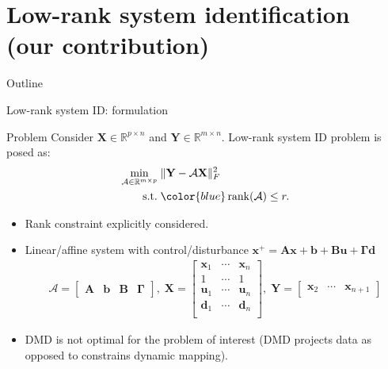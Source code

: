 \documentclass[10pt]{beamer}
\newcommand{\blue}{\color{blue}}
\newcommand{\bx}{\mathbf{x}}
\newcommand{\bX}{\mathbf{X}}
\newcommand{\bY}{\mathbf{Y}}
\newcommand{\bd}{\mathbf{d}}
\newcommand{\bA}{\mathbf{A}}
\newcommand{\bB}{\mathbf{B}}
\newcommand{\bb}{\mathbf{b}}
\newcommand{\bu}{\mathbf{u}}
\newcommand{\rank}{\mathop{\textrm{\textup{rank}}}}
\newcommand{\st}{\mathop{\textrm{\textup{s.t.}}}}
\begin{document}
\section{Low-rank system identification (our contribution)}
\begin{frame}{Outline}
\tableofcontents[currentsection]
\end{frame}
\begin{frame}{Low-rank system ID: formulation}
  \begin{block}{Problem}
    Consider $\bX\in\mathbb{R}^{p\times n}$ and $\bY\in\mathbb{R}^{m\times n}$. Low-rank system ID problem is posed as:
    \begin{align*}
      \min_{\mathcal{A}\in\mathbb{R}^{m\times p}}\;& \Vert \bY - \mathcal{A} \bX \Vert_F^2\\
      \st\;&{\blue \rank(\mathcal{A})\leq r.}
    \end{align*}
  \end{block}
  \vspace{0.1in}
  \begin{itemize}
  \item Rank constraint explicitly considered.
    \vspace{0.1in}
  \item Linear/affine system with control/disturbance $\bx^+ = \bA \bx + \bb + \bB \bu+ \mathbf{\Gamma}\bd$
    \begin{align*}
      \mathcal{A}=\begin{bmatrix}\bA &\bb&\bB &\mathbf{\Gamma} \end{bmatrix},\;\bX = \begin{bmatrix}\bx_1&\cdots&\bx_n\\1&\cdots&1\\ \bu_1&\cdots&\bu_n\\\bd_1&\cdots&\bd_n\\ \end{bmatrix},\;\bY = \begin{bmatrix}\bx_2&\cdots&\bx_{n+1} \end{bmatrix}
    \end{align*}
  \item DMD is not optimal for the problem of interest (DMD projects data as opposed to constrains dynamic mapping).
    \vspace{0.1in}
  \end{itemize}
\end{frame}
\end{document}
